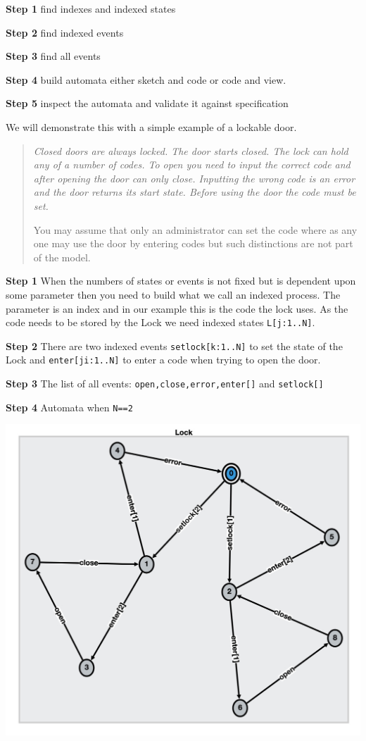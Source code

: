 \documentclass[]{article}
\begin{document}
 {\bf Step 1} find indexes and  indexed states

 {\bf Step 2} find indexed events

 {\bf Step 3} find all events

 {\bf Step 4} build automata
either sketch and code or code and view.

 {\bf Step 5} inspect the automata and validate it against specification

\noindent We will demonstrate this with a simple example of a lockable door.

\begin{quote}
{\it Closed doors are always locked. The door starts closed. The lock can hold any of  a number of  codes.  To open you need to input the correct code and after opening the door can only close. Inputting the wrong code is an error and the door returns its start state. Before using the door the code must be set.

You may assume that only an administrator can set the code  where as any one may use the door by entering codes but such distinctions are not part of the model.
}
\end{quote}

{\bf Step 1} When the numbers of states or events is not fixed but is dependent upon some parameter then you need to build what we call an indexed  process. The parameter is an index and in our example this is the {\sf code} the lock uses. As the code needs to be stored by the Lock we need indexed states \verb|L[j:1..N]|.

{\bf Step 2} There are two indexed events \verb|setlock[k:1..N]| to set the state of the Lock and \verb|enter[ji:1..N]| to enter a code when trying to open the door.

{\bf Step 3} The list of all events: \verb|open,close,error,enter[]| and \verb|setlock[]|

{\bf Step 4} Automata when \verb|N==2|

\noindent\begin{center} \includegraphics[scale=0.24]{Lock.jpg} \end{center}
\end{document}
